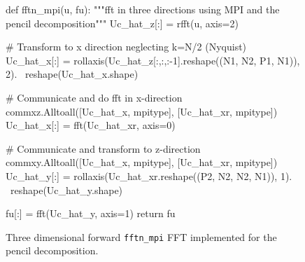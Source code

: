 \documentclass[final,3p,times,twocolumn]{elsarticle}
\newcommand{\inpyth}{\lstinline[style=inlinestyle]} %[]%
\begin{document}
\begin{figure}
\begin{python}
def fftn_mpi(u, fu):
    """fft in three directions using MPI and the pencil decomposition"""
    Uc_hat_z[:] = rfft(u, axis=2)

    # Transform to x direction neglecting k=N/2 (Nyquist)
    Uc_hat_x[:] = rollaxis(Uc_hat_z[:,:,:-1].reshape((N1, N2, P1, N1)), 2). \
                                             reshape(Uc_hat_x.shape)

    # Communicate and do fft in x-direction
    commxz.Alltoall([Uc_hat_x, mpitype], [Uc_hat_xr, mpitype])
    Uc_hat_x[:] = fft(Uc_hat_xr, axis=0)

    # Communicate and transform to z-direction
    commxy.Alltoall([Uc_hat_x, mpitype], [Uc_hat_xr, mpitype])
    Uc_hat_y[:] = rollaxis(Uc_hat_xr.reshape((P2, N2, N2, N1)), 1). \
                                     reshape(Uc_hat_y.shape)

    fu[:] = fft(Uc_hat_y, axis=1)
    return fu
\end{python}
\caption{Three dimensional forward \inpyth{fftn_mpi}  FFT implemented for the 
pencil decomposition.}
\label{fig:fftn_pencil}
\end{figure}
\end{document}
